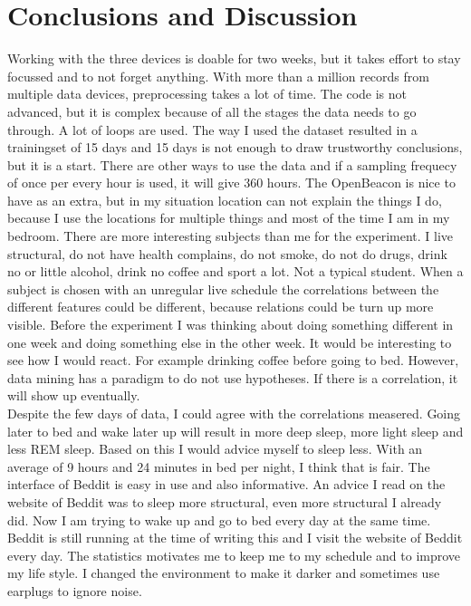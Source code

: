 \section{Conclusions and Discussion}
	Working with the three devices is doable for two weeks, but it takes effort to stay focussed and to not forget anything. With more than a million records from multiple data devices, preprocessing takes a lot of time. The code is not advanced, but it is complex because of all the stages the data needs to go through. A lot of loops are used. The way I used the dataset resulted in a trainingset of 15 days and 15 days is not enough to draw trustworthy conclusions, but it is a start. There are other ways to use the data and if a sampling frequecy of once per every hour is used, it will give 360 hours. The OpenBeacon is nice to have as an extra, but in my situation location can not explain the things I do, because I use the locations for multiple things and most of the time I am in my bedroom. 
	There are more interesting subjects than me for the experiment. I live structural, do not have health complains, do not smoke, do not do drugs, drink no or little alcohol, drink no coffee and sport a lot. Not a typical student. When a subject is chosen with an unregular live schedule the correlations between the different features could be different, because relations could be turn up more visible. Before the experiment I was thinking about doing something different in one week and doing something else in the other week. It would be interesting to see how I would react. For example drinking coffee before going to bed. However, data mining has a paradigm to do not use hypotheses. If there is a correlation, it will show up eventually.
	\\
	Despite the few days of data, I could agree with the correlations measered. Going later to bed and wake later up will result in more deep sleep, more light sleep and less REM sleep. Based on this I would advice myself to sleep less. With an average of 9 hours and 24 minutes in bed per night, I think that is fair. The interface of Beddit is easy in use and also informative. An advice I read on the website of Beddit was to sleep more structural, even more structural I already did. Now I am trying to wake up and go to bed every day at the same time. Beddit is still running at the time of writing this and I visit the website of Beddit every day. The statistics motivates me to keep me to my schedule and to improve my life style. I changed the environment to make it darker and sometimes use earplugs to ignore noise. 
